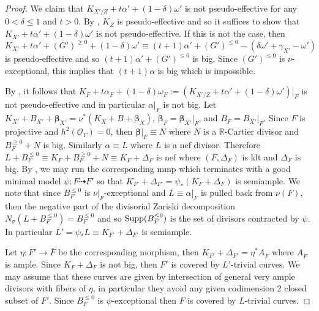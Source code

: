 \documentclass[11pt]{amsart}
\numberwithin{equation}{section}
\def\bbeta{\boldsymbol{\beta}}
\def\OO{\mathcal O}
\newcommand\R{{\mathbb{R}}}
\theoremstyle{definition}
\theoremstyle{definition}
\theoremstyle{definition}
\begin{document}
\begin{proof}
We claim that $K_{X'/Z}+t\alpha '+(1-\delta) \omega ' $ is not pseudo-effective for any $0<\delta\leq 1$ and $t>0$. By \cite{Ou25}, $K_Z$ is pseudo-effective and so it suffices to show that $K_{X'}+t\alpha '+(1-\delta) \omega ' $ is not pseudo-effective.
If this is not the case, then 
\[K_{X'}+t\alpha'+(G')^{\geq 0}+(1-\delta) \omega '\equiv (t+1)\alpha '+(G')^{\leq 0}-(\delta\omega '+\gamma _{X'}-\omega ')\] is pseudo-effective and so $(t+1)\alpha '+(G')^{\leq 0}$ is big. Since $(G')^{\leq 0}$ is $\nu$-exceptional, this implies that $(t+1)\alpha$ is big which is impossible.

By \cite[Theorem 5.2]{CH20}, it follows that $K_F+t\alpha _F+(1-\delta) \omega_F:=(K_{X'/Z}+t\alpha '+(1-\delta) \omega ' )|_F$  is not pseudo-effective and in particular $\alpha |_F$ is not big. Let $K_{X'}+B_{X'}+\bbeta _{X'}=\nu ^*(K_X+B+\bbeta _X)$, $\bbeta _F=\bbeta _{X'}|_F$, and $B_F=B_{X'}|_F$. Since $F$ is projective and $h^2(\OO _F)=0$, then $\bbeta |_F\equiv  N$ where $ N$ is a $\R$-Cartier divisor and $B_F^{\geq 0}+N$ is big. Similarly $\alpha \equiv L$ where $L$ is a nef divisor. Therefore  $L+B^{\leq 0}_F\equiv K_F+B_F^{\geq 0}+N\equiv K_F +\Delta _F$ is nef where $(F,\Delta _F)$ is klt and $\Delta _F$ is big. 
By \cite{BCHM10}, we may run the corresponding mmp
which terminates with a good minimal model $\psi: F\dasharrow F'$ so that $K_{F'}+\Delta _{F'}=\psi _*(K_F+\Delta _F)$ is semiample. We note that since
$B_F^{\leq 0}$ is $\nu |_F$-exceptional and $L\equiv \alpha |_F$ is pulled back from $\nu (F)$, then the negative part of the divisorial Zariski decomposition
${N_{\sigma}}(L+B_F^{\leq 0})=B_F^{\leq 0}$ and so ${\rm Supp}(B_F^{\leq 0})$ is the set of divisors contracted by $\psi$. In particular $L'=\psi_*L\equiv K_{F'}+\Delta _{F'}$ is semiample. 

Let $\eta:F'\to \bar F$ be the corresponding morphism, then $K_{F'}+\Delta _{F'}=\eta ^*A _{\bar F}$ where $A _{\bar F}$ is ample. Since $K_{F}+\Delta _F$ is not big, then $F'$ is covered by $L'$-trivial curves.
We may assume that these curves are given by intersection of general very ample divisors with fibers of $\eta$, in particular they avoid any given codimension 2 closed subset of $F'$.
Since $B_F^{\leq 0}$ is $\psi$-exceptional then $F$ is covered by $L$-trivial curves. 


\end{proof}
\end{document}
